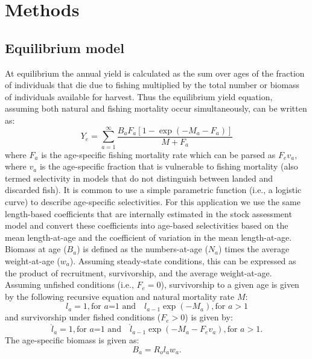 \section*{Methods} %
\label{sec:methods}

\subsection*{Equilibrium model} %
\label{sub:equilibrium_model}
At equilibrium the annual yield is calculated as the sum over ages of the fraction of individuals that die due to fishing multiplied by the total number or biomass of individuals available for harvest.  Thus the equilibrium yield equation, assuming both natural and fishing mortality occur simultaneously,  can be written as:
\begin{equation}\label{eq:Y_e}
	Y_e = \sum_{a=1}^\infty \frac{B_a F_a [1-\exp(-M_a-F_a)]}{M+F_a}
\end{equation}
where $F_a$ is the age-specific fishing mortality rate which can be parsed as $F_e v_a$, where $v_a$ is the age-specific fraction that is vulnerable to fishing mortality (also termed selectivity in models that do not distinguish between landed and discarded fish).  It is common to use a simple parametric function (i.e., a logistic curve) to describe age-specific selectivities.  For this application we use the same length-based coefficients that are internally estimated in the stock assessment model and convert these coefficients into age-based selectivities based on the mean length-at-age and the coefficient of variation in the mean length-at-age.  Biomass at age ($B_a$) is defined as the numbers-at-age ($N_a$) times the average weight-at-age ($w_a$).  Assuming steady-state conditions, this can be expressed as the product of recruitment, survivorship, and the average weight-at-age.  Assuming unfished conditions (i.e., $F_e=0$), survivorship to a given age is given by the following recursive equation and natural mortality rate $M$:
\begin{equation}\label{eq:unfished_survivorship}
	l_a = 1,  \mbox{for $a$=1 and} \quad l_{a-1} \exp(-M_a),  \mbox{for $a>1$}
\end{equation}
and survivorship under fished conditions ($F_e > 0$) is given by:
\begin{equation}\label{eq:fished_survivorship}
	\acute{l}_a =1, \mbox{for $a$=1 and} \quad \acute{l}_{a-1} \exp(-M_a-F_e v_a), \mbox{for $a>1$}. 
\end{equation}
The age-specific biomass is given as:
\begin{equation} \label{eq:B_a}
	B_a = R_o l_a w_a.
\end{equation}

